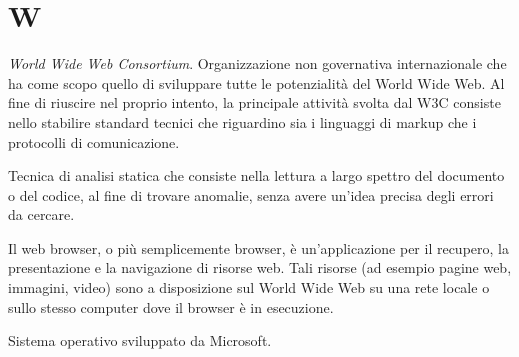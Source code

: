 

\section{W}

\textit{World Wide Web Consortium}. Organizzazione non governativa internazionale che ha come scopo quello di sviluppare tutte le potenzialità del World Wide Web. Al fine di riuscire nel proprio intento, la principale attività svolta dal W3C consiste nello stabilire standard tecnici che riguardino sia i linguaggi di markup che i protocolli di comunicazione.


Tecnica di analisi statica che consiste nella lettura a largo spettro del documento o del codice, al fine di trovare anomalie, senza avere un'idea precisa degli errori da cercare.


Il web browser, o più semplicemente browser, è un'applicazione per il recupero, la presentazione e la navigazione di risorse web. Tali risorse (ad esempio pagine web, immagini, video) sono a disposizione sul World Wide Web su una rete locale o sullo stesso computer dove il browser è in esecuzione. 

Sistema operativo sviluppato da Microsoft.

